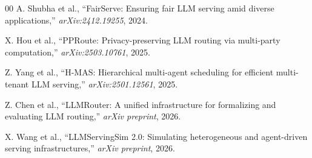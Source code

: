 \documentclass[conference]{IEEEtran}
\begin{document}
\begin{thebibliography}{00}
A. Shubha et al., ``FairServe: Ensuring fair LLM serving amid diverse
applications,'' \textit{arXiv:2412.19255}, 2024.

X. Hou et al., ``PPRoute: Privacy-preserving LLM routing via multi-party
computation,'' \textit{arXiv:2503.10761}, 2025.

Z. Yang et al., ``H-MAS: Hierarchical multi-agent scheduling for efficient
multi-tenant LLM serving,'' \textit{arXiv:2501.12561}, 2025.

Z. Chen et al., ``LLMRouter: A unified infrastructure for formalizing and evaluating LLM routing,'' \textit{arXiv preprint}, 2026.

X. Wang et al., ``LLMServingSim 2.0: Simulating heterogeneous and agent-driven serving infrastructures,'' \textit{arXiv preprint}, 2026.

\end{thebibliography}
\end{document}
